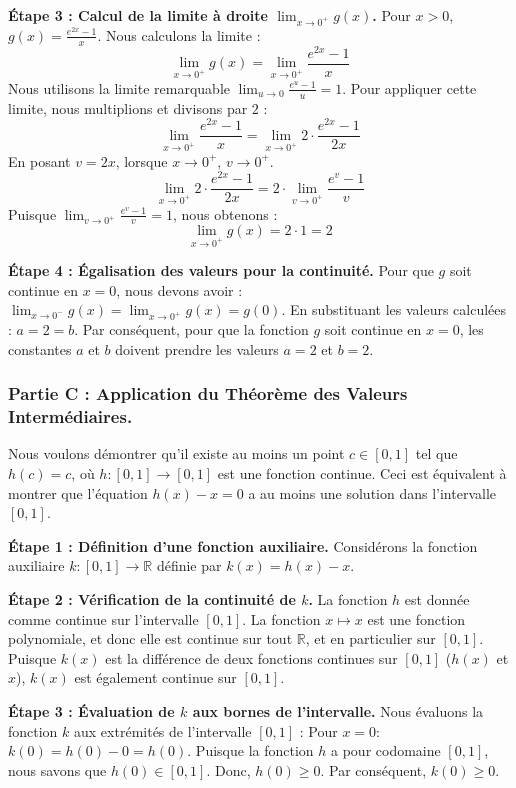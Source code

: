 \documentclass[12pt,a4paper]{report}
\begin{document}
\textbf{Étape 3 : Calcul de la limite à droite $\lim_{x \to 0^+} g(x)$.}
Pour $x > 0$, $g(x) = \frac{e^{2x}-1}{x}$.
Nous calculons la limite :
$$
\lim_{x \to 0^+} g(x) = \lim_{x \to 0^+} \frac{e^{2x}-1}{x}
$$
Nous utilisons la limite remarquable $\lim_{u \to 0} \frac{e^u-1}{u} = 1$.
Pour appliquer cette limite, nous multiplions et divisons par $2$ :
$$
\lim_{x \to 0^+} \frac{e^{2x}-1}{x} = \lim_{x \to 0^+} 2 \cdot \frac{e^{2x}-1}{2x}
$$
En posant $v = 2x$, lorsque $x \to 0^+$, $v \to 0^+$.
$$
\lim_{x \to 0^+} 2 \cdot \frac{e^{2x}-1}{2x} = 2 \cdot \lim_{v \to 0^+} \frac{e^v-1}{v}
$$
Puisque $\lim_{v \to 0^+} \frac{e^v-1}{v} = 1$, nous obtenons :
$$
\lim_{x \to 0^+} g(x) = 2 \cdot 1 = 2
$$

\textbf{Étape 4 : Égalisation des valeurs pour la continuité.}
Pour que $g$ soit continue en $x=0$, nous devons avoir :
$\lim_{x \to 0^-} g(x) = \lim_{x \to 0^+} g(x) = g(0)$.
En substituant les valeurs calculées :
$a = 2 = b$.
Par conséquent, pour que la fonction $g$ soit continue en $x=0$, les constantes $a$ et $b$ doivent prendre les valeurs $a=2$ et $b=2$.

\subsubsection{Partie C : Application du Théorème des Valeurs Intermédiaires.}

Nous voulons démontrer qu'il existe au moins un point $c \in [0,1]$ tel que $h(c) = c$, où $h: [0,1] \to [0,1]$ est une fonction continue.
Ceci est équivalent à montrer que l'équation $h(x) - x = 0$ a au moins une solution dans l'intervalle $[0,1]$.

\textbf{Étape 1 : Définition d'une fonction auxiliaire.}
Considérons la fonction auxiliaire $k: [0,1] \to \mathbb{R}$ définie par $k(x) = h(x) - x$.

\textbf{Étape 2 : Vérification de la continuité de $k$.}
La fonction $h$ est donnée comme continue sur l'intervalle $[0,1]$.
La fonction $x \mapsto x$ est une fonction polynomiale, et donc elle est continue sur tout $\mathbb{R}$, et en particulier sur $[0,1]$.
Puisque $k(x)$ est la différence de deux fonctions continues sur $[0,1]$ ($h(x)$ et $x$), $k(x)$ est également continue sur $[0,1]$.

\textbf{Étape 3 : Évaluation de $k$ aux bornes de l'intervalle.}
Nous évaluons la fonction $k$ aux extrémités de l'intervalle $[0,1]$ :
Pour $x=0$:
$k(0) = h(0) - 0 = h(0)$.
Puisque la fonction $h$ a pour codomaine $[0,1]$, nous savons que $h(0) \in [0,1]$.
Donc, $h(0) \ge 0$. Par conséquent, $k(0) \ge 0$.
\end{document}
